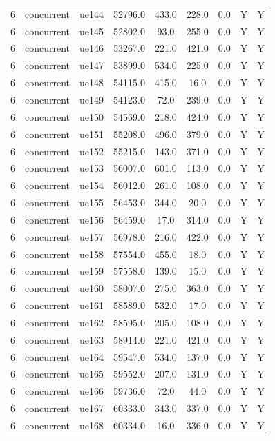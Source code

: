 \begin{table}[ht]
\begin{tabular}{|c|c|c|c|c|c|c|c|c|}
6 & concurrent & ue144 & 52796.0 & 433.0 & 228.0 & 0.0 & Y & Y \\
6 & concurrent & ue145 & 52802.0 & 93.0 & 255.0 & 0.0 & Y & Y \\
6 & concurrent & ue146 & 53267.0 & 221.0 & 421.0 & 0.0 & Y & Y \\
6 & concurrent & ue147 & 53899.0 & 534.0 & 225.0 & 0.0 & Y & Y \\
6 & concurrent & ue148 & 54115.0 & 415.0 & 16.0 & 0.0 & Y & Y \\
6 & concurrent & ue149 & 54123.0 & 72.0 & 239.0 & 0.0 & Y & Y \\
6 & concurrent & ue150 & 54569.0 & 218.0 & 424.0 & 0.0 & Y & Y \\
6 & concurrent & ue151 & 55208.0 & 496.0 & 379.0 & 0.0 & Y & Y \\
6 & concurrent & ue152 & 55215.0 & 143.0 & 371.0 & 0.0 & Y & Y \\
6 & concurrent & ue153 & 56007.0 & 601.0 & 113.0 & 0.0 & Y & Y \\
6 & concurrent & ue154 & 56012.0 & 261.0 & 108.0 & 0.0 & Y & Y \\
6 & concurrent & ue155 & 56453.0 & 344.0 & 20.0 & 0.0 & Y & Y \\
6 & concurrent & ue156 & 56459.0 & 17.0 & 314.0 & 0.0 & Y & Y \\
6 & concurrent & ue157 & 56978.0 & 216.0 & 422.0 & 0.0 & Y & Y \\
6 & concurrent & ue158 & 57554.0 & 455.0 & 18.0 & 0.0 & Y & Y \\
6 & concurrent & ue159 & 57558.0 & 139.0 & 15.0 & 0.0 & Y & Y \\
6 & concurrent & ue160 & 58007.0 & 275.0 & 363.0 & 0.0 & Y & Y \\
6 & concurrent & ue161 & 58589.0 & 532.0 & 17.0 & 0.0 & Y & Y \\
6 & concurrent & ue162 & 58595.0 & 205.0 & 108.0 & 0.0 & Y & Y \\
6 & concurrent & ue163 & 58914.0 & 221.0 & 421.0 & 0.0 & Y & Y \\
6 & concurrent & ue164 & 59547.0 & 534.0 & 137.0 & 0.0 & Y & Y \\
6 & concurrent & ue165 & 59552.0 & 207.0 & 131.0 & 0.0 & Y & Y \\
6 & concurrent & ue166 & 59736.0 & 72.0 & 44.0 & 0.0 & Y & Y \\
6 & concurrent & ue167 & 60333.0 & 343.0 & 337.0 & 0.0 & Y & Y \\
6 & concurrent & ue168 & 60334.0 & 16.0 & 336.0 & 0.0 & Y & Y \\

\end{tabular}
\end{table}
